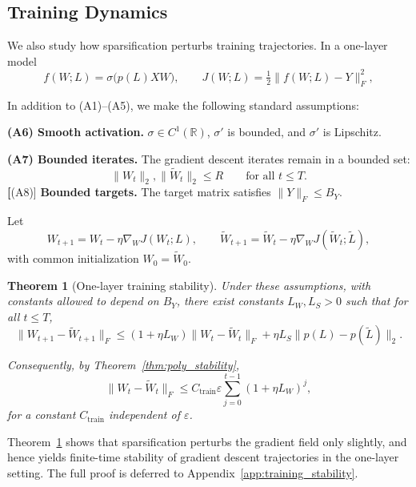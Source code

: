 \documentclass{article}
\newtheorem{theorem}{Theorem}
\begin{document}
\subsection{Training Dynamics}
We also study how sparsification perturbs training trajectories. In a one-layer model
\[
f(W;L)=\sigma\!\bigl(p(L)XW\bigr), \qquad
J(W;L)=\tfrac12\|f(W;L)-Y\|_F^2,
\]

In addition to (A1)--(A5), we make the following standard assumptions:

\textbf{(A6) Smooth activation.}
$\sigma \in C^1(\mathbb{R})$, $\sigma'$ is bounded, and $\sigma'$ is Lipschitz.

\textbf{(A7) Bounded iterates.}
The gradient descent iterates remain in a bounded set:
\[
\|W_t\|_2,\|\widetilde W_t\|_2 \le R
\qquad\text{for all } t\le T.
\]
\textbf[(A8)] \textbf{Bounded targets.}
The target matrix satisfies $\|Y\|_F \le B_Y$.

Let
\[
W_{t+1}=W_t-\eta \nabla_W J(W_t;L), \qquad
\widetilde W_{t+1}=\widetilde W_t-\eta \nabla_W J(\widetilde W_t;\widetilde L),
\]
with common initialization $W_0=\widetilde W_0$.

\begin{theorem}[One-layer training stability]
\label{thm:training_stability}
Under these assumptions, with constants allowed to depend on $B_Y$, there exist constants $L_W,L_S>0$ such that for all $t\le T$,
\begin{equation}
\label{eq:theorem_training_one_layer_main}
\|W_{t+1}-\widetilde W_{t+1}\|_F
\le
(1+\eta L_W)\|W_t-\widetilde W_t\|_F
+\eta L_S\|p(L)-p(\widetilde L)\|_2.
\end{equation}

Consequently, by Theorem~\ref{thm:poly_stability},
\begin{equation}
\|W_t-\widetilde W_t\|_F
\le
C_{\mathrm{train}}\varepsilon \sum_{j=0}^{t-1}(1+\eta L_W)^j,
\end{equation}
for a constant $C_{\mathrm{train}}$ independent of $\varepsilon$.
\end{theorem}
Theorem~\ref{thm:training_stability} shows that sparsification perturbs the gradient field only slightly, and hence yields finite-time stability of gradient descent trajectories in the one-layer setting. The full proof is deferred to Appendix~\ref{app:training_stability}.
\end{document}
